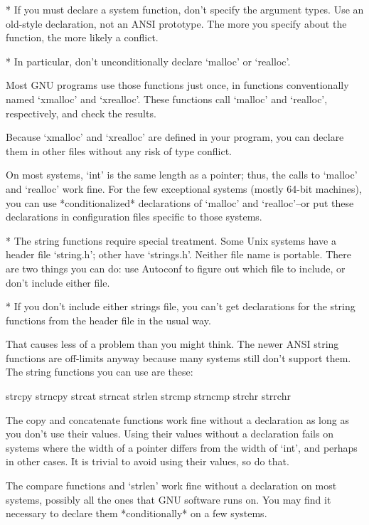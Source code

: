    * If you must declare a system function, don't specify the argument
     types.  Use an old-style declaration, not an ANSI prototype.  The
     more you specify about the function, the more likely a conflict.

   * In particular, don't unconditionally declare `malloc' or `realloc'.

     Most GNU programs use those functions just once, in functions
     conventionally named `xmalloc' and `xrealloc'.  These functions
     call `malloc' and `realloc', respectively, and check the results.

     Because `xmalloc' and `xrealloc' are defined in your program, you
     can declare them in other files without any risk of type conflict.

     On most systems, `int' is the same length as a pointer; thus, the
     calls to `malloc' and `realloc' work fine.  For the few
     exceptional systems (mostly 64-bit machines), you can use
     *conditionalized* declarations of `malloc' and `realloc'--or put
     these declarations in configuration files specific to those
     systems.

   * The string functions require special treatment.  Some Unix systems
     have a header file `string.h'; other have `strings.h'.  Neither
     file name is portable.  There are two things you can do: use
     Autoconf to figure out which file to include, or don't include
     either file.

   * If you don't include either strings file, you can't get
     declarations for the string functions from the header file in the
     usual way.

     That causes less of a problem than you might think.  The newer ANSI
     string functions are off-limits anyway because many systems still
     don't support them.  The string functions you can use are these:

          strcpy   strncpy   strcat   strncat
          strlen   strcmp   strncmp
          strchr   strrchr

     The copy and concatenate functions work fine without a declaration
     as long as you don't use their values.  Using their values without
     a declaration fails on systems where the width of a pointer
     differs from the width of `int', and perhaps in other cases.  It
     is trivial to avoid using their values, so do that.

     The compare functions and `strlen' work fine without a declaration
     on most systems, possibly all the ones that GNU software runs on.
     You may find it necessary to declare them *conditionally* on a few
     systems.

